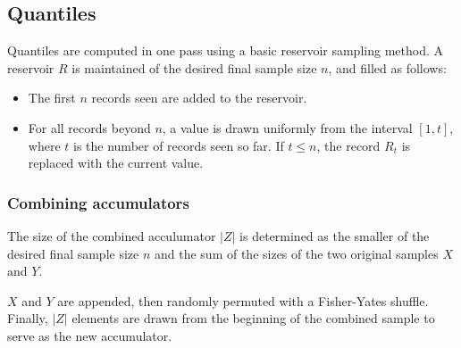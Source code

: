 \documentclass[a4paper]{article}
\begin{document}
\subsection{Quantiles}\label{quantiles}

Quantiles are computed in one pass using a basic reservoir
sampling\cite{vitter1985}\cite[pp.~144-145]{Knuth1997} method. A reservoir \(R\) is maintained of
the desired final sample size \(n\), and filled as follows:

\begin{itemize}
\item
The first \(n\) records seen are added to the reservoir.

\item
For all records beyond \(n\), a value is drawn uniformly from the
interval \([1, t]\), where \(t\) is the number of records seen so
far. If \(t \leq n\), the record \(R_t\) is replaced with the current value.
\end{itemize}

\subsubsection{Combining accumulators}

The size of the combined acculumator \(|Z|\) is determined as
the smaller of the desired final sample size \(n\) and the sum of the
sizes of the two original samples \(X\) and \(Y\).

\(X\) and \(Y\) are appended, then randomly permuted with a
Fisher-Yates shuffle\cite[pp.~145-146]{Knuth1997}. Finally, \(|Z|\) elements are drawn from the
beginning of the combined sample to serve as the new accumulator.



\end{document}
